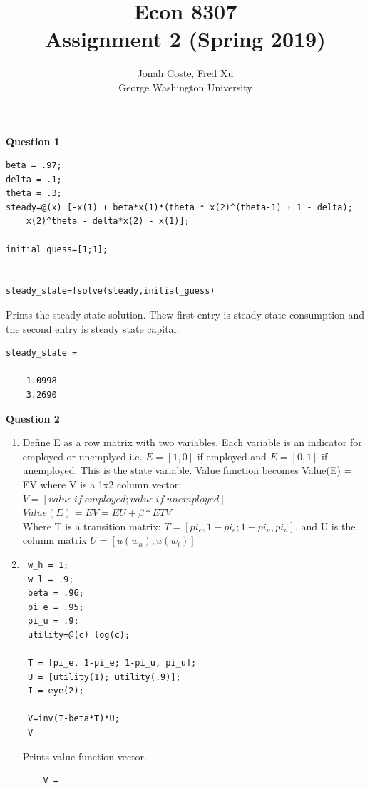 \documentclass[12pt]{article}
\begin{document}
\begin{onehalfspace}


\title{Econ 8307\\ Assignment 2 (Spring 2019)}
\author{Jonah Coste, Fred Xu\\George Washington University}
\date{}
\maketitle
\parskip 10pt
\textbf{Question 1}\\

\begin{lstlisting}
beta = .97;
delta = .1;
theta = .3;
steady=@(x) [-x(1) + beta*x(1)*(theta * x(2)^(theta-1) + 1 - delta);
	x(2)^theta - delta*x(2) - x(1)];

initial_guess=[1;1];


steady_state=fsolve(steady,initial_guess)
\end{lstlisting}
Prints the steady state solution. Thew first entry is steady state consumption and the second entry is steady state capital.
\begin{lstlisting}
steady_state =

    1.0998
    3.2690
\end{lstlisting}


\textbf{Question 2}\\
\begin{enumerate}[1.]
	\item
Define E as a row matrix with two variables. Each variable is an indicator for employed or unemplyed i.e. $E=[1,0]$ if employed and $E=[0,1]$ if unemployed. This is the state variable. Value function becomes Value(E) = EV where V is a 1x2 column vector: $V = [value\ if\ employed ; value\ if\ unemployed]$.\\
$Value(E)= EV = EU + \beta*ETV$\\
 Where T is a transition matrix: $T = [pi_e, 1-pi_e; 1-pi_u, pi_u]$, and U is the column matrix $U=[u(w_h); u(w_l)]$
	\item
	\begin{lstlisting}
 w_h = 1;
 w_l = .9;
 beta = .96;
 pi_e = .95;
 pi_u = .9;
 utility=@(c) log(c);

 T = [pi_e, 1-pi_e; 1-pi_u, pi_u];
 U = [utility(1); utility(.9)];
 I = eye(2);
 
 V=inv(I-beta*T)*U;
 V
	\end{lstlisting}
	Prints value function vector.
	\begin{lstlisting}
	V =


\end{lstlisting}
\end{enumerate}
\end{onehalfspace}
\end{document}
